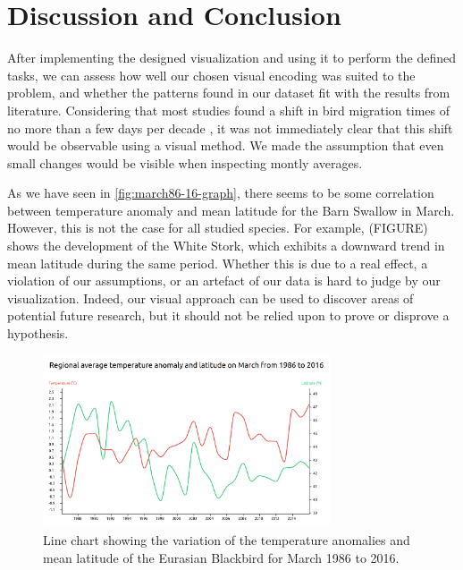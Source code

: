 \documentclass[journal]{vgtc}                %
\begin{document}
\section{Discussion and Conclusion}


After implementing the designed visualization and using it to perform the defined tasks, we can assess how well our chosen visual encoding was suited to the problem, and whether the patterns found in our dataset fit with the results from literature. Considering that most studies found a shift in bird migration times of no more than a few days per decade \cite{marra2005influence,huppop2003north,cotton2003avian}, it was not immediately clear that this shift would be observable using a visual method. We made the assumption that even small changes would be visible when inspecting montly averages.

As we have seen in \autoref{fig:march86-16-graph}, there seems to be some correlation between temperature anomaly and mean latitude for the Barn Swallow in March. However, this is not the case for all studied species. For example, (FIGURE) shows the development of the White Stork, which exhibits a downward trend in mean latitude during the same period. Whether this is due to a real effect, a violation of our assumptions, or an artefact of our data is hard to judge by our visualization. Indeed, our visual approach can be used to discover areas of potential future research, but it should not be relied upon to prove or disprove a hypothesis.

\begin{figure}[h]
  \centering
  \includegraphics[width=85mm]{march86-16-graph-eurbla}
  \caption{Line chart showing the variation of the temperature anomalies and mean latitude of the Eurasian Blackbird for March 1986 to 2016.}
  \label{fig:march86-16-graph-eurbla}
\end{figure}
\end{document}
